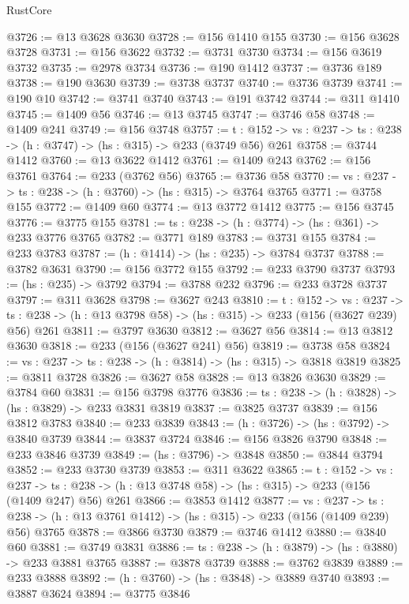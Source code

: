 \begin{lexlean}{RustCore}
\begin{coremodule}
@3726 := @13 @3628 @3630
@3728 := @156 @1410 @155
@3730 := @156 @3628 @3728
@3731 := @156 @3622
@3732 := @3731 @3730
@3734 := @156 @3619 @3732
@3735 := @2978 @3734
@3736 := @190 @1412
@3737 := @3736 @189
@3738 := @190 @3630
@3739 := @3738 @3737
@3740 := @3736 @3739
@3741 := @190 @10
@3742 := @3741 @3740
@3743 := @191 @3742
@3744 := @311 @1410
@3745 := @1409 @56
@3746 := @13 @3745
@3747 := @3746 @58
@3748 := @1409 @241
@3749 := @156 @3748
@3757 := {t : @152} ->
  {vs : @237} -> {ts : @238} -> (h : @3747) -> (hs : @315) -> @233 (@3749 @56) @261
@3758 := @3744 @1412
@3760 := @13 @3622 @1412
@3761 := @1409 @243
@3762 := @156 @3761
@3764 := @233 (@3762 @56)
@3765 := @3736 @58
@3770 := {vs : @237} -> {ts : @238} -> (h : @3760) -> (hs : @315) -> @3764 @3765
@3771 := @3758 @155
@3772 := @1409 @60
@3774 := @13 @3772 @1412
@3775 := @156 @3745
@3776 := @3775 @155
@3781 := {ts : @238} -> (h : @3774) -> (hs : @361) -> @233 @3776 @3765
@3782 := @3771 @189
@3783 := @3731 @155
@3784 := @233 @3783
@3787 := (h : @1414) -> (hs : @235) -> @3784 @3737
@3788 := @3782 @3631
@3790 := @156 @3772 @155
@3792 := @233 @3790 @3737
@3793 := (hs : @235) -> @3792
@3794 := @3788 @232
@3796 := @233 @3728 @3737
@3797 := @311 @3628
@3798 := @3627 @243
@3810 := {t : @152} ->
  {vs : @237} ->
  {ts : @238} -> (h : @13 @3798 @58) -> (hs : @315) -> @233 (@156 (@3627 @239) @56) @261
@3811 := @3797 @3630
@3812 := @3627 @56
@3814 := @13 @3812 @3630
@3818 := @233 (@156 (@3627 @241) @56)
@3819 := @3738 @58
@3824 := {vs : @237} -> {ts : @238} -> (h : @3814) -> (hs : @315) -> @3818 @3819
@3825 := @3811 @3728
@3826 := @3627 @58
@3828 := @13 @3826 @3630
@3829 := @3784 @60
@3831 := @156 @3798 @3776
@3836 := {ts : @238} -> (h : @3828) -> (hs : @3829) -> @233 @3831 @3819
@3837 := @3825 @3737
@3839 := @156 @3812 @3783
@3840 := @233 @3839
@3843 := (h : @3726) -> (hs : @3792) -> @3840 @3739
@3844 := @3837 @3724
@3846 := @156 @3826 @3790
@3848 := @233 @3846 @3739
@3849 := (hs : @3796) -> @3848
@3850 := @3844 @3794
@3852 := @233 @3730 @3739
@3853 := @311 @3622
@3865 := {t : @152} ->
  {vs : @237} ->
  {ts : @238} -> (h : @13 @3748 @58) -> (hs : @315) -> @233 (@156 (@1409 @247) @56) @261
@3866 := @3853 @1412
@3877 := {vs : @237} ->
  {ts : @238} -> (h : @13 @3761 @1412) -> (hs : @315) -> @233 (@156 (@1409 @239) @56) @3765
@3878 := @3866 @3730
@3879 := @3746 @1412
@3880 := @3840 @60
@3881 := @3749 @3831
@3886 := {ts : @238} -> (h : @3879) -> (hs : @3880) -> @233 @3881 @3765
@3887 := @3878 @3739
@3888 := @3762 @3839
@3889 := @233 @3888
@3892 := (h : @3760) -> (hs : @3848) -> @3889 @3740
@3893 := @3887 @3624
@3894 := @3775 @3846

\end{coremodule}
\end{lexlean}
